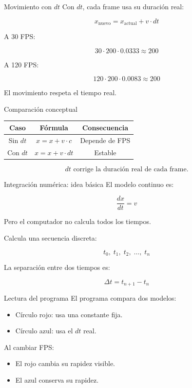 \documentclass{beamer}
\begin{document}
\begin{frame}{Movimiento con \(dt\)}
Con \(dt\), cada frame usa su duración real:

\[
x_{\text{nuevo}} =
x_{\text{actual}} + v \cdot dt
\]

A 30 FPS:

\[
30 \cdot 200 \cdot 0.0333 \approx 200
\]

A 120 FPS:

\[
120 \cdot 200 \cdot 0.0083 \approx 200
\]

El movimiento respeta el tiempo real.
\end{frame}

\begin{frame}{Comparación conceptual}
\begin{center}
\begin{tabular}{|c|c|c|}
\hline
Caso & Fórmula & Consecuencia \\
\hline
Sin \(dt\) & \(x=x+v\cdot c\) & Depende de FPS \\
\hline
Con \(dt\) & \(x=x+v\cdot dt\) & Estable \\
\hline
\end{tabular}
\end{center}

\medskip

\[
dt \text{ corrige la duración real de cada frame.}
\]
\end{frame}

\begin{frame}{Integración numérica: idea básica}
El modelo continuo es:

\[
\frac{dx}{dt}=v
\]

Pero el computador no calcula todos los tiempos.

\medskip

Calcula una secuencia discreta:

\[
t_0,\; t_1,\; t_2,\; \ldots,\; t_n
\]

La separación entre dos tiempos es:

\[
\Delta t = t_{n+1}-t_n
\]
\end{frame}


\begin{frame}{Lectura del programa}
El programa compara dos modelos:

\begin{itemize}
    \item Círculo rojo: usa una constante fija.
    \item Círculo azul: usa el \(dt\) real.
\end{itemize}

Al cambiar FPS:

\begin{itemize}
    \item El rojo cambia su rapidez visible.
    \item El azul conserva su rapidez.
\end{itemize}
\end{frame}
\end{document}
